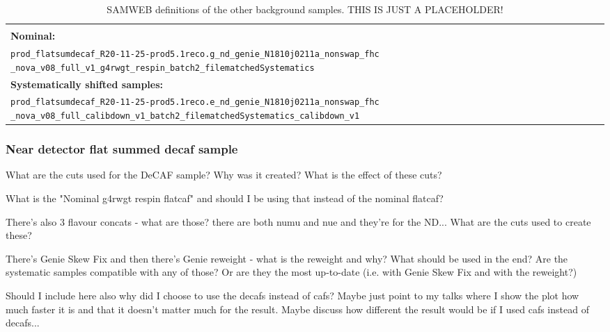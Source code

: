 \documentclass[12pt]{article}
\begin{document}
\begin{table}[!ht]
\centering
\begin{tabular}{p{\textwidth}}
\hline\hline\\
\textbf{Nominal:}\\
\texttt{prod\_flatsumdecaf\_R20-11-25-prod5.1reco.g\_nd\_genie\_N1810j0211a\_nonswap\_fhc} \texttt{\_nova\_v08\_full\_v1\_g4rwgt\_respin\_batch2\_filematchedSystematics}\\[2mm]
\textbf{Systematically shifted samples:}\\
\texttt{prod\_flatsumdecaf\_R20-11-25-prod5.1reco.e\_nd\_genie\_N1810j0211a\_nonswap\_fhc} \texttt{\_nova\_v08\_full\_calibdown\_v1\_batch2\_filematchedSystematics\_calibdown\_v1}\\[2mm]
\hline\hline
\end{tabular}
\caption{SAMWEB definitions of the other background samples. THIS IS JUST A PLACEHOLDER!}
\label{tab:NueCCMECDefinitions}
\end{table}

\subsubsection*{Near detector flat summed decaf sample}
What are the cuts used for the DeCAF sample? Why was it created? What is the effect of these cuts?

What is the "Nominal g4rwgt respin flatcaf" and should I be using that instead of the nominal flatcaf?

There's also 3 flavour concats - what are those? there are both numu and nue and they're for the ND... What are the cuts used to create these?

There's Genie Skew Fix and then there's Genie reweight  - what is the reweight and why? What should be used in the end? Are the systematic samples compatible with any of those? Or are they the most up-to-date (i.e. with Genie Skew Fix and with the reweight?)

Should I include here also why did I choose to use the decafs instead of cafs? Maybe just point to my talks where I show the plot how much faster it is and that it doesn't matter much for the result. Maybe discuss how different the result would be if I used cafs instead of decafs...
\end{document}
